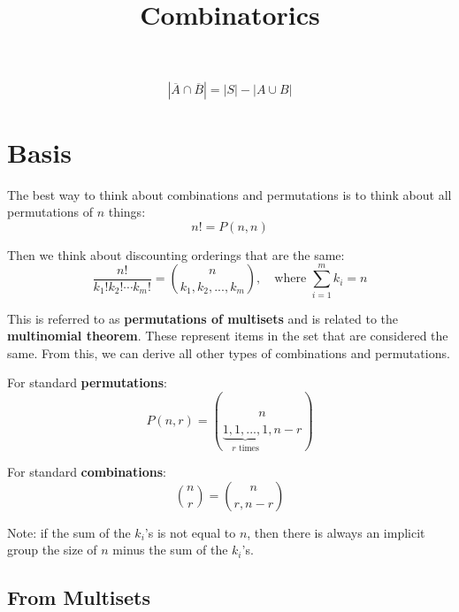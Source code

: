 \documentclass{article}
\title{Combinatorics}
\begin{document}
    \maketitle

    \tableofcontents

    \begin{equation}
        |\overline{A} \cap \overline{B}| = |S| - |A \cup B|
    \end{equation}

    \section{Basis}

    The best way to think about combinations and permutations is to think about all permutations of $n$ things: \begin{equation}
        n! = P(n, n)
    \end{equation}

    Then we think about discounting orderings that are the same: \begin{equation}
        \frac{n!}{k_1! k_2! \cdots k_m!} = {n \choose k_1, k_2, ..., k_m}, \quad \text{where } \sum_{i = 1}^m{k_i} = n
    \end{equation}

    This is referred to as \textbf{permutations of multisets} and is related to the \textbf{multinomial theorem}. These represent items in the set that are considered the same. From this, we can derive all other types of combinations and permutations.

    For standard \textbf{permutations}: \begin{equation}
        P(n, r) = {n \choose \underbrace{1, 1, ..., 1}_{r \text{ times}}, n - r}
    \end{equation}

    For standard \textbf{combinations}: \begin{equation}
        {n \choose r} = {n \choose r, n - r}
    \end{equation}

    Note: if the sum of the $k_i$'s is not equal to $n$, then there is always an implicit group the size of $n$ minus the sum of the $k_i$'s.

    \subsection{From Multisets}
\end{document}
